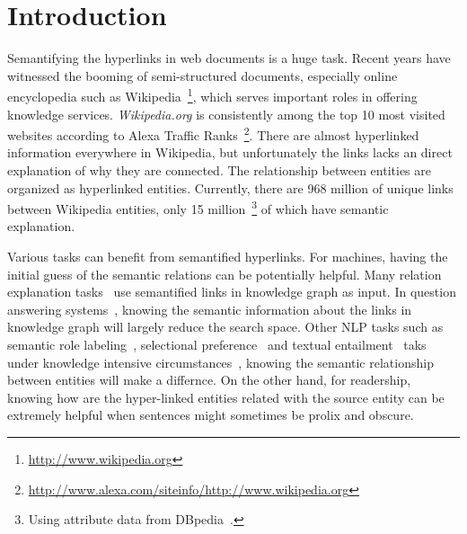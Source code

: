 \section{Introduction}


Semantifying the hyperlinks in web documents is a huge task.
Recent years have witnessed the booming of semi-structured documents, especially online encyclopedia such as  Wikipedia~\footnote{\small\url{http://www.wikipedia.org}}, which serves important roles in offering knowledge services.
{\it Wikipedia.org} is consistently among the top 10 most visited websites according to Alexa Traffic Ranks~\footnote{\small\url{http://www.alexa.com/siteinfo/http://www.wikipedia.org}}.
There are almost hyperlinked information everywhere in Wikipedia, but unfortunately the links lacks an direct explanation of why they are connected.
The relationship between entities are organized as hyperlinked entities.
Currently, there are 968 million of unique links between Wikipedia entities, only 15 million~\footnote{Using attribute data from DBpedia~\cite{dbpedia}.} of which have semantic explanation.

Various tasks can benefit from semantified hyperlinks.
For machines, having the initial guess of the semantic relations can be potentially helpful.
Many relation explanation tasks~\cite{fang2011rex,nakashole2012discovering,voskarideslearning} use semantified links in knowledge graph as input.
In question answering systems~\cite{yang2014slq}, knowing the semantic information about the links in knowledge graph will largely reduce the search space.
Other NLP tasks such as semantic role labeling~\cite{palmer2010semantic}, selectional preference~\cite{pantel2007isp} and textual entailment~\cite{androutsopoulos2010survey} taks under knowledge intensive circumstances~\cite{yao2012unsupervised,exner2011using}, knowing the semantic relationship between entities will make a differnce.
On the other hand, for readership, knowing how are the hyper-linked entities related with the source entity can be extremely helpful when sentences might sometimes be prolix and obscure.

